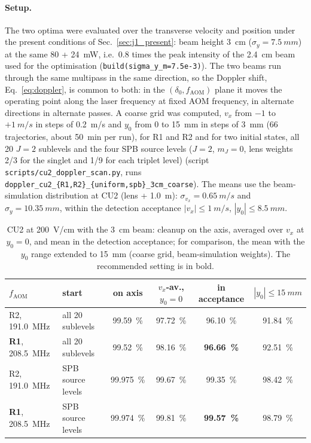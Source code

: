 \documentclass[11pt,a4paper,oneside]{report}
\newcommand{\code}[1]{\texttt{#1}}
\newcommand{\sigy}{\sigma_{y}}
\newcommand{\fAOM}{f_{\mathrm{AOM}}}
\begin{document}
\paragraph{Setup.} The two optima were evaluated over the transverse velocity and position
under the present conditions of Sec.~\ref{sec:j1_present}: beam height \SI{3}{cm}
($\sigy=\SI{7.5}{mm}$) at the same 80 + \SI{24}{mW}, i.e.\ 0.8 times the peak intensity of the
\SI{2.4}{cm} beam used for the optimisation (\code{build(sigma\_y\_m=7.5e-3)}). The two beams run
through the same multipass in the same direction, so the Doppler shift, Eq.~\eqref{eq:doppler},
is common to both: in the $(\delta_0,\fAOM)$ plane it moves the operating point along the laser
frequency at fixed AOM frequency, in alternate directions in alternate passes. A coarse grid
was computed, $v_x$ from $-1$ to $+\SI{1}{m/s}$ in steps of \SI{0.2}{m/s} and $y_0$ from 0 to
\SI{15}{mm} in steps of \SI{3}{mm} (66 trajectories, about \SI{50}{min} per run), for R1 and R2
and for two initial states, all 20 $J=2$ sublevels and the four SPB source levels ($J=2$,
$m_J=0$, lens weights 2/3 for the singlet and 1/9 for each triplet level) (script
\code{scripts/cu2\_doppler\_scan.py}, runs \code{doppler\_cu2\_\{R1,R2\}\_\{uniform,spb\}\_3cm\_coarse}).
The means use the beam-simulation distribution at CU2 (lens + \SI{1.0}{m}): $\sigma_{v_x}=\SI{0.65}{m/s}$
and $\sigma_y=\SI{10.35}{mm}$, within the detection acceptance $|v_x|\leq\SI{1}{m/s}$,
$|y_0|\leq\SI{8.5}{mm}$.

\begin{table}[htbp]
  \centering
  \caption[CU2: cleanup over the transverse distribution]{CU2 at \SI{200}{V/cm} with the
  \SI{3}{cm} beam: cleanup on the axis, averaged over $v_x$ at $y_0=0$, and mean in the detection
  acceptance; for comparison, the mean with the $y_0$ range extended to \SI{15}{mm} (coarse
  grid, beam-simulation weights). The recommended setting is in bold.}
  \label{tab:j2_doppler}
  \small
  \setlength{\tabcolsep}{4pt}
  \begin{tabular}{llcccc}
    \toprule
    $\fAOM$ & start & on axis & $v_x$-av., $y_0=0$ & \textbf{in acceptance} & $|y_0|\leq\SI{15}{mm}$ \\
    \midrule
    R2, \SI{191.0}{MHz} & all 20 sublevels & \SI{99.59}{\percent} & \SI{97.72}{\percent} & \SI{96.10}{\percent} & \SI{91.84}{\percent} \\
    \textbf{R1}, \SI{208.5}{MHz} & all 20 sublevels & \SI{99.52}{\percent} & \SI{98.16}{\percent} & \textbf{\SI{96.66}{\percent}} & \SI{92.51}{\percent} \\
    R2, \SI{191.0}{MHz} & SPB source levels & \SI{99.975}{\percent} & \SI{99.67}{\percent} & \SI{99.35}{\percent} & \SI{98.42}{\percent} \\
    \textbf{R1}, \SI{208.5}{MHz} & SPB source levels & \SI{99.974}{\percent} & \SI{99.81}{\percent} & \textbf{\SI{99.57}{\percent}} & \SI{98.79}{\percent} \\
    \bottomrule
  \end{tabular}
\end{table}
\end{document}
